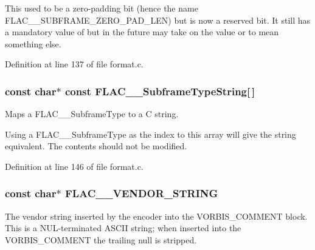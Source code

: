 This used to be a zero-\/padding bit (hence the name F\+L\+A\+C\+\_\+\+\_\+\+S\+U\+B\+F\+R\+A\+M\+E\+\_\+\+Z\+E\+R\+O\+\_\+\+P\+A\+D\+\_\+\+L\+EN) but is now a reserved bit. It still has a mandatory value of {} but in the future may take on the value {} or {} to mean something else. 

Definition at line 137 of file format.\+c.

\subsubsection[{\texorpdfstring{F\+L\+A\+C\+\_\+\+\_\+\+Subframe\+Type\+String}{FLAC__SubframeTypeString}}]{ {\bf const} char$\ast$ {\bf const} F\+L\+A\+C\+\_\+\+\_\+\+Subframe\+Type\+String\mbox{[}$\,$\mbox{]}}\hypertarget{group__flac__format_gabc358f252630dfc52e875eb05c3b0fd9}{}\label{group__flac__format_gabc358f252630dfc52e875eb05c3b0fd9}
Maps a F\+L\+A\+C\+\_\+\+\_\+\+Subframe\+Type to a C string.

Using a F\+L\+A\+C\+\_\+\+\_\+\+Subframe\+Type as the index to this array will give the string equivalent. The contents should not be modified. 

Definition at line 146 of file format.\+c.

\subsubsection[{\texorpdfstring{F\+L\+A\+C\+\_\+\+\_\+\+V\+E\+N\+D\+O\+R\+\_\+\+S\+T\+R\+I\+NG}{FLAC__VENDOR_STRING}}]{ {\bf const} char$\ast$ F\+L\+A\+C\+\_\+\+\_\+\+V\+E\+N\+D\+O\+R\+\_\+\+S\+T\+R\+I\+NG}\hypertarget{group__flac__format_gac05d5441acd3daad33d287165c450a05}{}\label{group__flac__format_gac05d5441acd3daad33d287165c450a05}
The vendor string inserted by the encoder into the V\+O\+R\+B\+I\+S\+\_\+\+C\+O\+M\+M\+E\+NT block. This is a N\+U\+L-\/terminated A\+S\+C\+II string; when inserted into the V\+O\+R\+B\+I\+S\+\_\+\+C\+O\+M\+M\+E\+NT the trailing null is stripped. 

